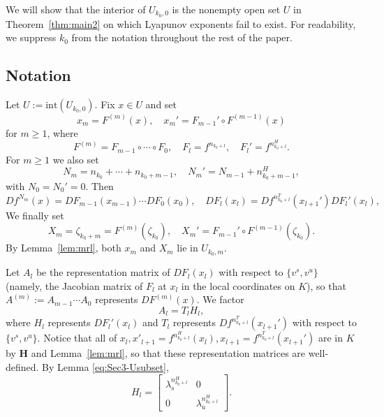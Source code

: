 \documentclass{amsart}
\theoremstyle{plain}
\theoremstyle{definition}
\theoremstyle{remark}
\numberwithin{equation}{section}
\begin{document}
We will show that the interior of $U_{k_0,0}$ is the nonempty open set $U$
in Theorem~\ref{thm:main2} on which Lyapunov exponents fail to exist.
For readability, we suppress $k_0$ from the notation throughout the rest
of the paper.

\subsection{Notation}

Let $U:=\mathrm{int}(U_{k_0,0})$.
Fix $x\in U$ and set
\[
    x_m = F^{(m)}(x),\quad
    x_m' = F_{m-1}'\circ F^{(m-1)}(x)
\]
for $m\ge 1$,
where
\[
    F^{(m)} = F_{m-1}\circ\cdots\circ F_0,\quad
    F_l = f^{n_{k_0+l}},\quad
    F_l' = f^{n_{k_0+l}^H}.
\]
For $m\ge 1$ we also set
\[
    N_m = n_{k_0}+\cdots+n_{k_0+m-1},\quad
    N_m' = N_{m-1}+n_{k_0+m-1}^H,
\]
with $N_0=N_0'=0$.  Then
\[
    Df^{N_m}(x)=DF_{m-1}(x_{m-1})\cdots DF_0(x_0),
    \quad
    DF_l(x_l)=Df^{n_{k_0+l}^T}(x_{l+1}')DF_l'(x_l),
\]
We finally set 
\[
X_m=\zeta_{k_0+m}=F^{(m)}(\zeta_{k_0}),\quad
X_m'=F_{m-1}'\circ F^{(m-1)}(\zeta_{k_0}).
\]
By Lemma~\ref{lem:mrl}, both $x_m$ and $X_m$ lie in $U_{k_0,m}$.


Let $A_l$ be the representation matrix of $DF_l(x_l)$ with respect to $\{v^s,v^u\}$ (namely, the Jacobian matrix of $F_l$ at $x_l$ in the local coordinates on $K$), so that
$A^{(m)}:=A_{m-1}\cdots A_0$ represents $DF^{(m)}(x)$.
We factor 
\[
A_l=T_l H_l,
\]
where $H_l$ represents $DF_l'(x_l)$
and $T_l$ represents $Df^{n_{k_0+l}^T}(x_{l+1}')$ with respect to $\{v^s,v^u\}$.
Notice that all of $x_l, x'_{l+1}=f^{n_{k_0+l}^H}(x_l), x_{l+1}=f^{n_{k_0+l}^T}(x_{l+1}')$ are in $K$ by {\bf H} and Lemma~\ref{lem:mrl}, so that these representation matrices are well-defined.
By Lemma \ref{eq:Sec3-Usubset},
\begin{equation}\label{eq:1104ex}
    H_l=\begin{bmatrix}
        \lambda_s^{n_{k_0+l}^H} & 0\\
        0 & \lambda_u^{n_{k_0+l}^H}
    \end{bmatrix}.
\end{equation}
\end{document}
